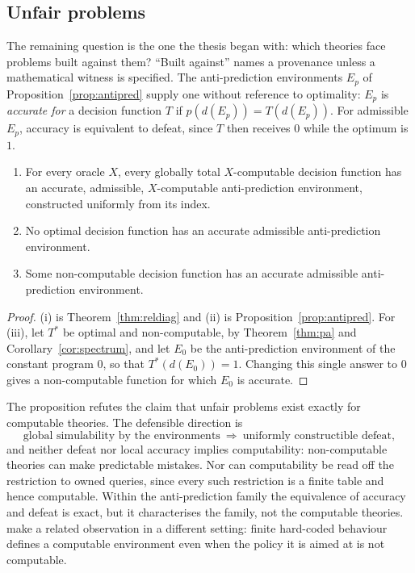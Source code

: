 \subsection{Unfair problems}\label{sec:unfair}

The remaining question is the one the thesis began with: which theories face problems built against
them? \enquote{Built against} names a provenance unless a mathematical witness is specified. The
anti-prediction environments $E_p$ of Proposition~\ref{prop:antipred} supply one without reference to
optimality: $E_p$ is \emph{accurate for} a decision function $T$ if $p(d(E_p))=T(d(E_p))$. For
admissible $E_p$, accuracy is equivalent to defeat, since $T$ then receives $0$ while the optimum is
$1$.

\begin{proposition}\label{prop:unfair}
\leavevmode
\begin{enumerate}[label=(\roman*)]
  \item For every oracle $X$, every globally total $X$-computable decision function has an accurate,
        admissible, $X$-computable anti-prediction environment, constructed uniformly from its index.
  \item No optimal decision function has an accurate admissible anti-prediction environment.
  \item Some non-computable decision function has an accurate admissible anti-prediction environment.
\end{enumerate}
\end{proposition}

\begin{proof}
(i) is Theorem~\ref{thm:reldiag} and (ii) is Proposition~\ref{prop:antipred}. For (iii), let $T^*$ be
optimal and non-computable, by Theorem~\ref{thm:pa} and Corollary~\ref{cor:spectrum}, and let $E_0$ be
the anti-prediction environment of the constant program $0$, so that $T^*(d(E_0))=1$. Changing this
single answer to $0$ gives a non-computable function for which $E_0$ is accurate.
\end{proof}

The proposition refutes the claim that unfair problems exist exactly for computable theories. The
defensible direction is
\[
  \text{global simulability by the environments}\ \Longrightarrow\ \text{uniformly constructible
  defeat},
\]
and neither defeat nor local accuracy implies computability: non-computable theories can make
predictable mistakes. Nor can computability be read off the restriction to owned queries, since every
such restriction is a finite table and hence computable. Within the anti-prediction family the
equivalence of accuracy and defeat is exact, but it characterises the family, not the computable
theories. \textcite[Thm.~18]{leikehutter2015} make a related observation in a different setting:
finite hard-coded behaviour defines a computable environment even when the policy it is aimed at is
not computable.

